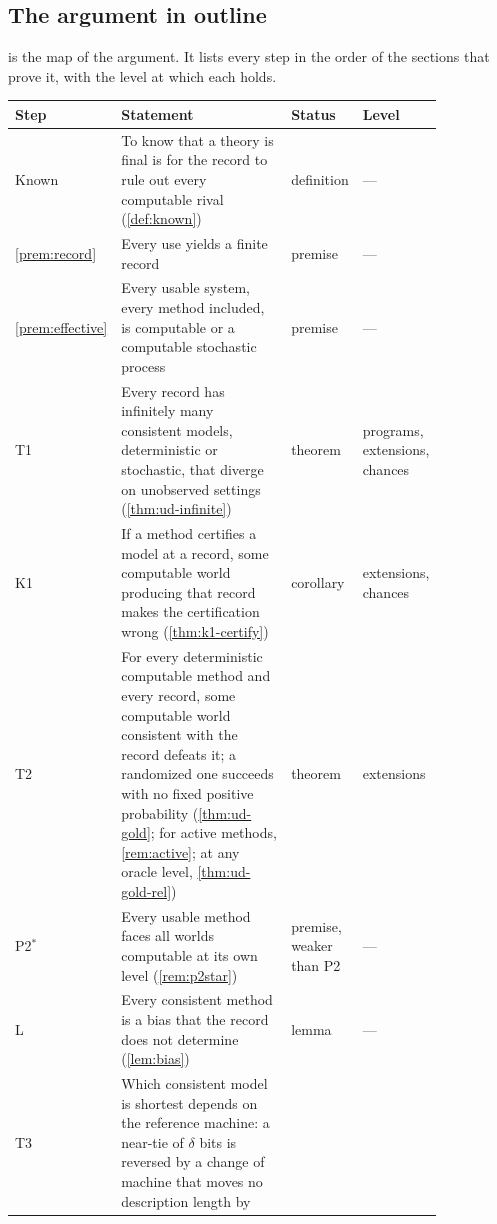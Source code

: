 \subsection{The argument in outline}\label{sec:outline}

 is the map of the argument. It lists every step in the order of the
sections that prove it, with the level at which each holds.

\begin{table}[!htbp]
\centering
\small
\begin{tabular}{@{}l>{\raggedright\arraybackslash}p{0.55\linewidth}%
>{\raggedright\arraybackslash}p{0.13\linewidth}%
>{\raggedright\arraybackslash}p{0.17\linewidth}@{}}
\toprule
Step & Statement & Status & Level \\
\midrule
Known & To know that a theory is final is for the record to rule out every
  computable rival (\cref{def:known}) & definition & --- \\
\ref{prem:record} & Every use yields a finite record & premise & --- \\
\ref{prem:effective} & Every usable system, every method included, is computable or
  a computable stochastic process & premise & --- \\
T1 & Every record has infinitely many consistent models, deterministic or stochastic,
  that diverge on unobserved settings (\cref{thm:ud-infinite}) & theorem &
  programs, extensions, chances \\
K1 & If a method certifies a model at a record, some computable world producing that
  record makes the certification wrong (\cref{thm:k1-certify}) & corollary &
  extensions, chances \\
T2 & For every deterministic computable method and every record, some computable world
  consistent with the record defeats it; a randomized one succeeds with no fixed
  positive probability (\cref{thm:ud-gold}; for active methods, \cref{rem:active}; at any oracle level,
  \cref{thm:ud-gold-rel})
  & theorem & extensions \\
P2$^{*}$ & Every usable method faces all worlds computable at its own level
  (\cref{rem:p2star}) & premise, weaker than P2 & --- \\
L & Every consistent method is a bias that the record does not determine (\cref{lem:bias}) &
  lemma & --- \\
T3 & Which consistent model is shortest depends on the reference machine: a near-tie of
  $\delta$ bits is reversed by a change of machine that moves no description length by

\end{tabular}
\end{table}
